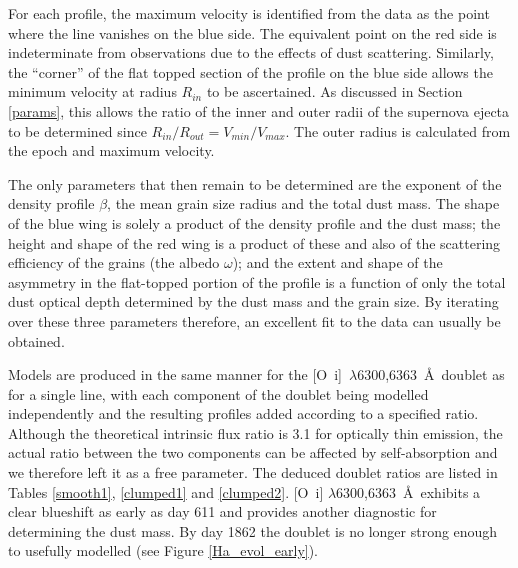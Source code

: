 \documentclass[useAMS,usenatbib,usegraphicx]{mnras}
\begin{document}
For each profile, the maximum velocity is identified from the data as the 
point where the line vanishes on the blue side.  The equivalent point on 
the red side is indeterminate from observations due to the effects of 
dust scattering.  Similarly, the ``corner'' of the flat topped section of the 
profile on the blue side allows the minimum velocity at radius $R_{in}$ to be 
ascertained. As discussed in Section \ref{params}, this allows the ratio 
of the inner and outer radii of the supernova ejecta to be determined since 
$R_{in}/R_{out}=V_{min}/V_{max}$.  The outer radius is calculated from the 
epoch and maximum velocity.

The only parameters that then remain to be determined are the exponent of 
the density profile $\beta$, the mean grain size radius and the total dust mass.  The shape 
of the blue wing is solely a product of the density profile and the dust 
mass; the height and shape of the red wing is a product of these and also 
of the scattering efficiency of the grains (the albedo $\omega$); and the 
extent and shape of the asymmetry in the flat-topped portion of the 
profile is a function of only the total dust optical depth determined by the 
dust mass and the grain size.  By iterating over these three parameters 
therefore, an excellent fit to the data can usually be obtained.

Models are produced in the same manner for the 
[O~{\sc i}]~$\lambda$6300,6363~\AA\ doublet as for a single line, with each component 
of the doublet being modelled independently and the resulting profiles 
added according to a specified ratio.  Although the theoretical intrinsic flux ratio 
is 3.1 for optically thin emission, the actual ratio between the two components can be 
affected by self-absorption \citep{Li1992} and we therefore 
left it as a free parameter.  The deduced doublet ratios are listed in Tables \ref{smooth1}, \ref{clumped1} and \ref{clumped2}.  [O~{\sc i}] 
$\lambda$6300,6363~\AA\ exhibits a clear blueshift as early as day 611 
and provides another diagnostic for determining the dust mass.  By day 1862 
the doublet is no longer strong enough to usefully 
modelled (see Figure \ref{Ha_evol_early}).
\end{document}
